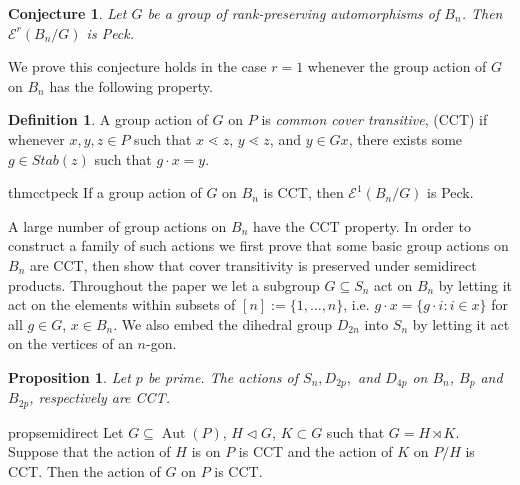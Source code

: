 \documentclass[10 pt]{amsart}
\theoremstyle{plain}
\newtheorem{prop}[thm]{Proposition}
\newtheorem{conjecture}[thm]{Conjecture}
\theoremstyle{definition}
\newtheorem{defn}[thm]{Definition}
\theoremstyle{remark}
\numberwithin{equation}{section}
\begin{document}
\begin{conjecture}\label{conj:F_of_BnG_Peck}
Let $G$ be a group of rank-preserving automorphisms of $B_n$.  Then $\mathcal E^r(B_n/G)$ is Peck.
\end{conjecture}

We prove this conjecture holds in the case $r=1$ whenever the group action of $G$ on $B_n$ has the following property.

\begin{defn}
\label{defn:cover_transitive}
A group action of $G$ on $P$ is \textit{common cover transitive}, (CCT) if whenever $x,y,z\in P$ such that $x\lessdot z$, $y\lessdot z$, and $y\in Gx$, there exists some $g\in Stab(z)$ such that $g\cdot x = y.$
\end{defn}

\begin{restatable}{thm}{cctpeck}
\label{thm:cover_transitive_implies_Peck}
If a group action of $G$ on $B_n$ is CCT, then $\mathcal E^1(B_n/G)$ is Peck.
\end{restatable}

A large number of group actions on $B_n$ have the CCT property.  In order to construct a family of such actions we first prove that some basic group actions on $B_n$ are CCT, then show that cover transitivity is preserved under semidirect products.  Throughout the paper we let a subgroup $G\subseteq S_n$ act on $B_n$ by letting it act on the elements within subsets of $[n]:= \{1,\ldots, n\}$, i.e. $g\cdot x = \{g\cdot i\colon i\in x\}$  for all $g\in G$, $x\in B_n$.  We also embed the dihedral group $D_{2n}$ into $S_n$ by letting it act on the vertices of an $n$-gon.

\begin{prop}\label{prop:cover_transitive_building_blocks}
Let $p$ be prime.  The actions of $S_n, D_{2p},$ and $D_{4p}$ on $B_n$, $B_p$ and $B_{2p}$, respectively are CCT.
\end{prop}

\begin{restatable}{prop}{semidirect}
\label{prop:semidirect_product_preservation}
Let $G\subseteq \operatorname{Aut}(P)$, $H\triangleleft G$, $K\subset G$ such that $G = H\rtimes K$.  Suppose that the action of $H$ is on $P$ is CCT and the action of $K$ on $P/H$ is CCT. Then the action of $G$ on $P$ is CCT.
\end{restatable}
\end{document}
